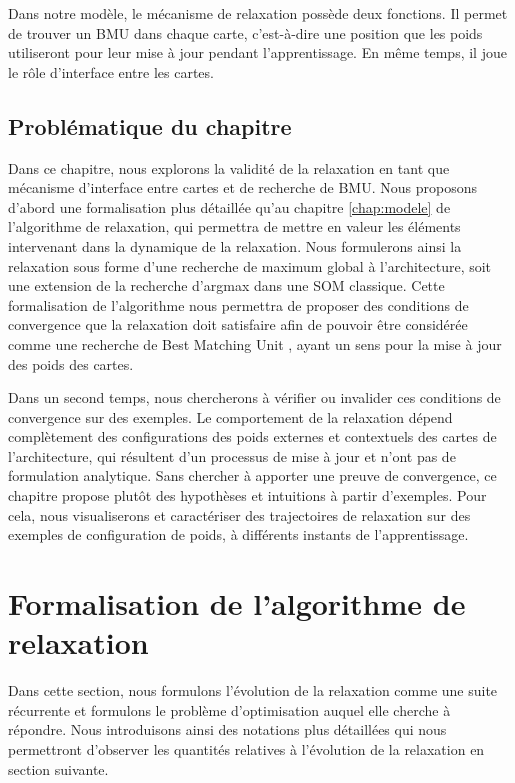 \documentclass[../main]{subfiles}
\begin{document}
Dans notre modèle, le mécanisme de relaxation possède deux fonctions. Il permet de trouver un BMU dans chaque carte, c'est-à-dire une position que les poids utiliseront pour leur mise à jour pendant l'apprentissage. En même temps, il joue le rôle d'interface entre les cartes.

\subsection{Problématique du chapitre}

Dans ce chapitre, nous explorons la validité de la relaxation en tant que mécanisme d'interface entre cartes et de recherche de BMU.
Nous proposons d'abord une formalisation plus détaillée qu'au chapitre \ref{chap:modele} de l'algorithme de relaxation, qui permettra de mettre en valeur les éléments intervenant dans la dynamique de la relaxation. Nous formulerons ainsi la relaxation sous forme d'une recherche de maximum global à l'architecture, soit une extension de la recherche d'argmax dans une SOM classique.
Cette formalisation de l'algorithme nous permettra de proposer des conditions de convergence que la relaxation doit satisfaire afin de pouvoir être considérée comme une recherche de \og Best Matching Unit \fg{}, ayant un sens pour la mise à jour des poids des cartes.

Dans un second temps, nous chercherons à vérifier ou invalider ces conditions de convergence sur des exemples.
Le comportement de la relaxation dépend complètement des configurations des poids externes et contextuels des cartes de l'architecture, qui résultent d'un processus de mise à jour et n'ont pas de formulation analytique. Sans chercher à apporter une preuve de convergence, ce chapitre propose plutôt des hypothèses et intuitions à partir d'exemples. Pour cela, nous visualiserons et caractériser des trajectoires de relaxation sur des exemples de configuration de poids, à différents instants de l'apprentissage.


\section{Formalisation de l'algorithme de relaxation}

Dans cette section, nous formulons l'évolution de la relaxation comme une suite récurrente et formulons le problème d'optimisation auquel elle cherche à répondre.
Nous introduisons ainsi des notations plus détaillées qui nous permettront d'observer les quantités relatives à l'évolution de la relaxation en section suivante.
\end{document}
